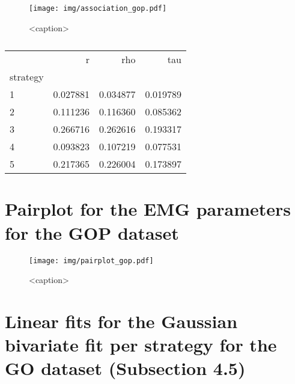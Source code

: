 \documentclass{article}
\begin{document}
\begin{figure}[htbp]
    \centering
    \texttt{[image: img/association\_gop.pdf]}
    \caption{<caption>}
    \label{<label>}
\end{figure}
\begin{table}
    \centering
    \caption{}
    \begin{tabular}{lrrr}
        \toprule
                 & r        & rho      & tau      \\
        strategy &          &          &          \\
        \midrule
        1        & 0.027881 & 0.034877 & 0.019789 \\
        2        & 0.111236 & 0.116360 & 0.085362 \\
        3        & 0.266716 & 0.262616 & 0.193317 \\
        4        & 0.093823 & 0.107219 & 0.077531 \\
        5        & 0.217365 & 0.226004 & 0.173897 \\
        \bottomrule
    \end{tabular}
\end{table}

\section{Pairplot for the EMG parameters for the GOP dataset}

\begin{figure}[htbp]
    \centering
    \texttt{[image: img/pairplot\_gop.pdf]}
    \caption{<caption>}
    \label{<label>}
\end{figure}

\section{Linear fits for the Gaussian bivariate fit per strategy for the GO dataset (Subsection 4.5)}
\end{document}
